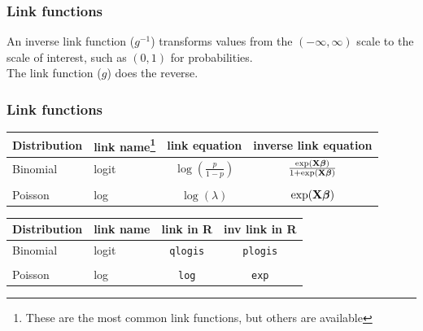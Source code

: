 \documentclass[color=usenames,dvipsnames]{beamer}\usepackage[]{graphicx}\usepackage[]{color}
\begin{document}
\begin{frame}
  \frametitle{Link functions}
  An inverse link function ($g^{-1}$) transforms values from the $(-\infty,\infty)$
  scale to the scale of interest, such as $(0,1)$ for probabilities.  \\
  \pause
  \vfill
  The link function ($g$) does the reverse. \\
\end{frame}


\begin{frame}
  \frametitle{Link functions}
  \centering
  \begin{tabular}{llcc}
    \hline
    Distribution & link name\footnote{\scriptsize These are the most common link functions, but others are available} & link equation             & inverse link equation       \\
    \hline
    Binomial     & logit     & $\log(\frac{p}{1-p})$ & $\frac{\exp({\bf
          X}{\bm \beta})}{1 + \exp({\bf X}{\bm \beta})}$                        \\
                 &           &                           &                             \\
    Poisson      & log       & $\log(\lambda)$               & $\exp({\bf X}{\bm \beta})$  \\
    \hline
  \end{tabular}

\pause
\vfill

\begin{tabular}{llcc}
    \hline
    Distribution & link name & link in {\bf R}  & inv link in {\bf R}       \\
    \hline
    Binomial     & logit     & {\tt qlogis} & {\tt plogis}                        \\
                 &           &                           &                             \\
    Poisson      & log       & {\tt log}    & {\tt exp}  \\
    \hline
  \end{tabular}
\end{frame}
\end{document}
